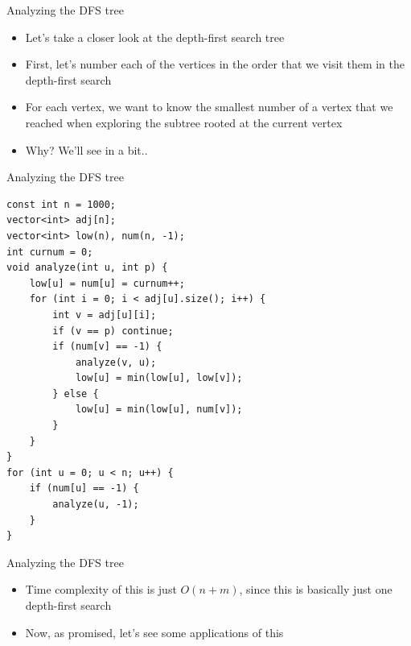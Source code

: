 \documentclass{beamer}
\begin{document}
\begin{frame}[plain]{Analyzing the DFS tree}
    \vspace{20pt}
    \begin{itemize}
        \item Let's take a closer look at the depth-first search tree
        \vspace{10pt}
        \item First, let's number each of the vertices in the order that we visit them in the depth-first search
        \item For each vertex, we want to know the smallest number of a vertex that we reached when exploring the subtree rooted at the current vertex
        \vspace{10pt}
        \item Why? We'll see in a bit..
    \end{itemize}
\end{frame}

\begin{frame}{Analyzing the DFS tree}
    \begin{verbatim}
const int n = 1000;
vector<int> adj[n];
vector<int> low(n), num(n, -1);
int curnum = 0;
void analyze(int u, int p) {
    low[u] = num[u] = curnum++;
    for (int i = 0; i < adj[u].size(); i++) {
        int v = adj[u][i];
        if (v == p) continue;
        if (num[v] == -1) {
            analyze(v, u);
            low[u] = min(low[u], low[v]);
        } else {
            low[u] = min(low[u], num[v]);
        }
    }
}
for (int u = 0; u < n; u++) {
    if (num[u] == -1) {
        analyze(u, -1);
    }
}
    \end{verbatim}
\end{frame}

\begin{frame}[plain]{Analyzing the DFS tree}
    \vspace{30pt}
    \begin{itemize}
        \item Time complexity of this is just $O(n + m)$, since this is basically just one depth-first search
        \vspace{20pt}
        \item Now, as promised, let's see some applications of this
    \end{itemize}
\end{frame}
\end{document}
